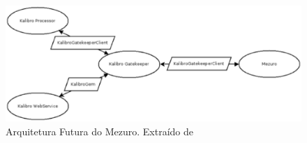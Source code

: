 \graphicspath{{figuras/}}
\begin{figure}[h]
\centering
\includegraphics[width=1.0\textwidth]{MezuroNovo.eps}
\caption{Arquitetura Futura do Mezuro. Extraído de \cite{manzo2014}}
\label{fig:mezuro-future-design}
\end{figure}




